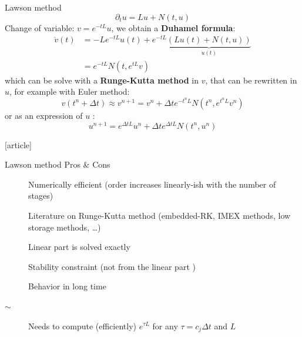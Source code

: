 \documentclass{beamer}
\newcommand{\cmark}{{\color{dgreen}\ding{52}}}
\newcommand{\xmark}{{\color{red}\ding{55}}}
\newcommand{\bmark}{{\color{orange}$\sim$}}
\newcommand{\mbold}[1]{{\textbf{\color{PLB}#1}}}
\newcommand{\customcite}[1]{\cite{#1}}
\begin{document}
\begin{frame}{Lawson method}
  $$
    \partial_t u = Lu + N(t,u)
  $$
  Change of variable: \mbold{$v = e^{-tL}u$}, we obtain a \mbold{Duhamel formula}:
  $$
    \begin{aligned}
      \dot{v}(t) &= -Le^{-tL}u(t) + e^{-tL}\underbrace{\left(Lu(t) + N(t,u)\right)}_{\dot{u}(t)} \\
                 &= e^{-tL}N(t,e^{tL}v)
    \end{aligned}
  $$
  which can be solve with a \mbold{Runge-Kutta method} in $v$, that can be rewritten in $u$, for example with Euler method:
  $$
    v(t^n+\Delta t) \approx v^{n+1} = v^n + \Delta t e^{-t^nL}N(t^n,e^{t^nL}v^n)
  $$
  or as an expression of $u$ :
  $$
    u^{n+1} = e^{\Delta t L}u^n + \Delta te^{\Delta t L}N(t^n,u^n)
  $$
  \begin{thebibliography}{9}
    [article]
     \customcite{Lawson:1967a}
     \customcite{Hochbruck:2020}
  \end{thebibliography}
\end{frame}
\begin{frame}{Lawson method}
  {Pros \& Cons}
  \begin{description}
    \item[\cmark] Numerically efficient (order increases linearly-ish with the number of stages)
    \item[\cmark] Literature on Runge-Kutta method (embedded-RK, IMEX methods, low storage methods, \dots)
    \item[\cmark] Linear part is solved exactly
    \item[\xmark] Stability constraint (not from the linear part \cmark)
    \item[\xmark] Behavior in long time
    \item[\bmark] Needs to compute (efficiently) $e^{\tau L}$ for any $\tau=c_j\Delta t$ and $L$
  \end{description}
\end{frame}
\end{document}
